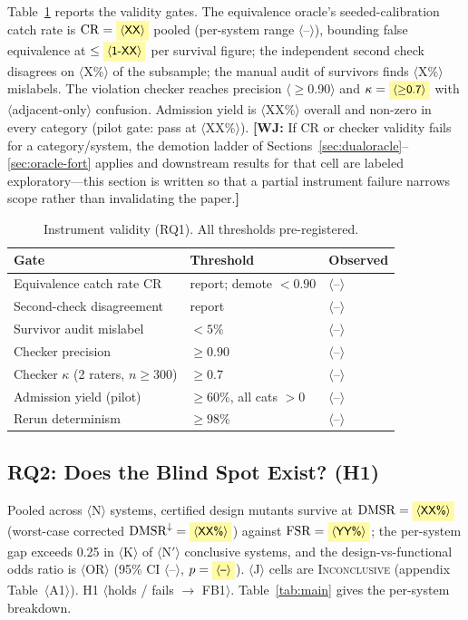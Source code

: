 \documentclass[conference]{IEEEtran}
\newcommand{\ph}[1]{\colorbox{yellow!35}{\small$\langle$\textsf{#1}$\rangle$}}
\newcommand{\wj}[1]{{\color{blue}\footnotesize\textbf{[WJ:} #1\textbf{]}}}
\newcommand{\dmsr}{\mathrm{DMSR}}
\newcommand{\fsr}{\mathrm{FSR}}
\begin{document}
Table~\ref{tab:oracle} reports the validity gates. The equivalence oracle's seeded-calibration catch rate is $\mathrm{CR} = \ph{XX}$ pooled (per-system range \ph{--}), bounding false equivalence at $\leq \ph{1-XX}$ per survival figure; the independent second check disagrees on \ph{X\%} of the subsample; the manual audit of survivors finds \ph{X\%} mislabels. The violation checker reaches precision \ph{$\geq$0.90} and $\kappa = \ph{$\geq$0.7}$ with \ph{adjacent-only} confusion. Admission yield is \ph{XX\%} overall and non-zero in every category (pilot gate: pass at \ph{XX\%}). \wj{If CR or checker validity fails for a category/system, the demotion ladder of Sections~\ref{sec:dualoracle}--\ref{sec:oracle-fort} applies and downstream results for that cell are labeled exploratory---this section is written so that a partial instrument failure narrows scope rather than invalidating the paper.}

\begin{table}[t]
\centering
\caption{Instrument validity (RQ1). All thresholds pre-registered.}
\label{tab:oracle}
\begin{tabular}{@{}lll@{}}
\toprule
Gate & Threshold & Observed \\
\midrule
Equivalence catch rate $\mathrm{CR}$ & report; demote $<0.90$ & \ph{--} \\
Second-check disagreement & report & \ph{--} \\
Survivor audit mislabel & $<5\%$ & \ph{--} \\
Checker precision & $\geq 0.90$ & \ph{--} \\
Checker $\kappa$ (2 raters, $n\geq300$) & $\geq 0.7$ & \ph{--} \\
Admission yield (pilot) & $\geq 60\%$, all cats $>0$ & \ph{--} \\
Rerun determinism & $\geq 98\%$ & \ph{--} \\
\bottomrule
\end{tabular}
\end{table}

\subsection{RQ2: Does the Blind Spot Exist? (H1)}\label{sec:results-rq2}

Pooled across \ph{N} systems, certified design mutants survive at $\dmsr = \ph{XX\%}$ (worst-case corrected $\dmsr^{\downarrow} = \ph{XX\%}$) against $\fsr = \ph{YY\%}$; the per-system gap exceeds 0.25 in \ph{K} of \ph{N$'$} conclusive systems, and the design-vs-functional odds ratio is \ph{OR} (95\% CI \ph{--}, $p = \ph{--}$). \ph{J} cells are \textsc{Inconclusive} (appendix Table~\ph{A1}). H1 \ph{holds / fails $\to$ FB1}. Table~\ref{tab:main} gives the per-system breakdown.
\end{document}
